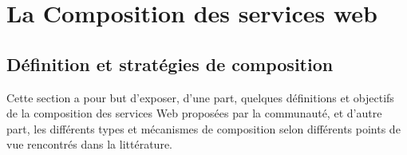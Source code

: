 \chapter{La Composition des services web}



  


\newpage

  \section{Définition et stratégies de composition}
  \label{sec:defin-et-caract}

  Cette section a pour but d'exposer, d'une part, quelques définitions
  et objectifs de la composition des services Web proposées par la
  communauté, et d'autre part, les différents types et mécanismes de
  composition selon différents points de vue rencontrés dans la
  littérature.
  

